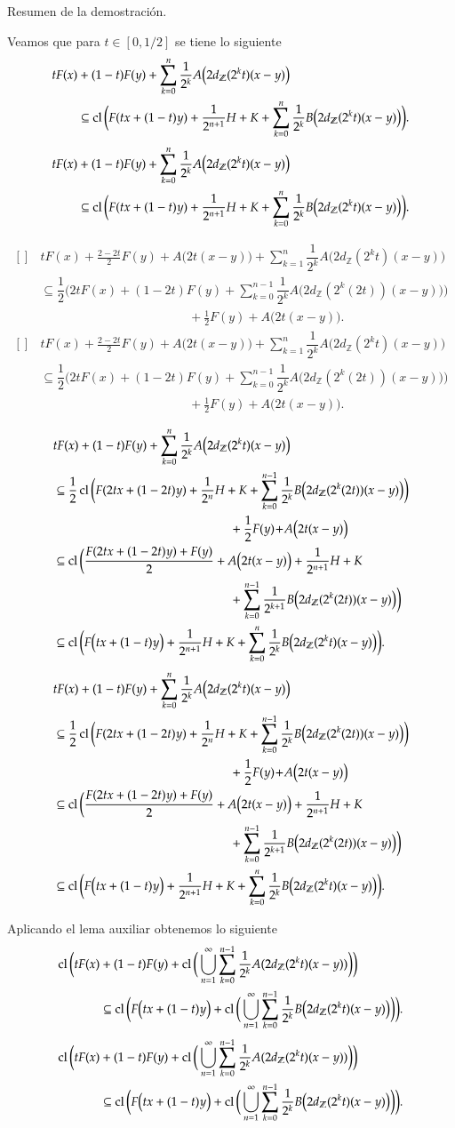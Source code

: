 \documentclass[notheorems,envcountsect,serif,mathserif,professionalfonts,spanish,10pt]{beamer}
\newcommand{\Z}{\mathbb{Z}}
\newcommand{\cl}{\mathop{\hbox{\rm cl}}\nolimits}
\theoremstyle{definition}
\def\Eq#1#2{\ifthenelse{\equal{#1}{*}}
  {\begin{equation*}\begin{aligned}[]#2\end{aligned}\end{equation*}}
  {\begin{equation}\begin{aligned}[]\label{E#1}#2\end{aligned}\end{equation}}}
\begin{document}
\begin{frame}[allowframebreaks]{Resumen de la demostración.}
	\begin{block}{}
	Veamos que para $t\in[0,1/2]$ se tiene lo siguiente\vspace{-.3cm}
	\Eq{*}{
	tF(x)&+(1-t)F(y) + \sum_{k=0}^{n}{\dfrac{1}{2^k}A\big(2 d_{\Z}(2^k t)(x-y)\big)} \\
	&\subseteq \cl\bigg(F(tx+(1-t)y) + \dfrac{1}{2^{n+1}} H + K +
		\sum_{k=0}^{n}{\dfrac{1}{2^k}B\big(2 d_{\Z}(2^k t)(x-y)\big)}\bigg). 
	}
	\end{block}
	
	\begin{block}{}
	\Eq{*}{
		&tF(x)+\frac{2-2t}2F(y)+ A\big(2t(x-y)\big) 
		+ \sum_{k=1}^{n}{\dfrac{1}{2^k}A\big(2 d_{\Z}(2^kt)(x-y)\big)} \\
		&\subseteq \dfrac{1}{2}\bigg( 2tF(x)+(1-2t)F(y)
		+ \sum_{k=0}^{n-1}{\dfrac{1}{2^k}A\big(2 d_{\Z}(2^k(2t))(x-y)\big)} \bigg) \\
		&\hspace{5cm}+ \frac{1}{2}F(y) \!+\! A\big(2t(x-y)\big).
	}
	\end{block}
	
	\begin{block}{}

	\Eq{*}{
 & tF(x)+(1-t)F(y) + \sum_{k=0}^{n}{\dfrac{1}{2^k}A\big(2 d_{\Z}(2^k t)(x-y)\big)} \\
 & \subseteq \dfrac{1}{2}\cl\bigg(F(2tx + (1-2t)y)+ \frac{1}{2^n}H + K 
   + \sum_{k=0}^{n-1} \dfrac{1}{2^k}B\big(2 d_{\Z}(2^k(2t))(x-y)\big)\bigg) \\
 &\hspace{5cm} + \frac{1}{2}F(y) \!+\! A\big(2t(x-y)\big)\\
 & \subseteq \cl\bigg(\dfrac{F(2tx + (1-2t)y)+ F(y)}{2}+ A\big(2t(x-y)\big) 
     + \frac{1}{2^{n+1}}H + K\\
&\hspace{5cm}		+ \sum_{k=0}^{n-1}\dfrac{1}{2^{k+1}}B\big(2d_{\Z}(2^k(2t))(x-y)\big)\bigg)\\
& \subseteq  \cl\bigg(F\big(tx+(1-t)y\big) + \frac{1}{2^{n+1}}H + K 
  + \sum_{k=0}^{n}\dfrac{1}{2^{k}}B\big(2d_{\Z}(2^k t)(x-y)\big)\bigg).
	}
	\end{block}
	
	\begin{block}{}
	Aplicando el lema auxiliar obtenemos lo siguiente
	\Eq{*}{
  \cl\bigg(tF(x)&+(1-t)F(y) + \cl\bigg(\bigcup_{n=1}^\infty
     \sum_{k=0}^{n-1}\dfrac{1}{2^k}A(2 d_{\Z}(2^k t)(x-y))\bigg)\bigg)\\
  &\subseteq \cl\bigg(F\big(tx+(1-t)y\big) +\cl\bigg(\bigcup_{n=1}^\infty 
     \sum_{k=0}^{n-1}\dfrac{1}{2^{k}}B\big(2d_{\Z}(2^k t)(x-y)\big)\bigg)\bigg).
	}
	\end{block}
	

\end{frame}
\end{document}
